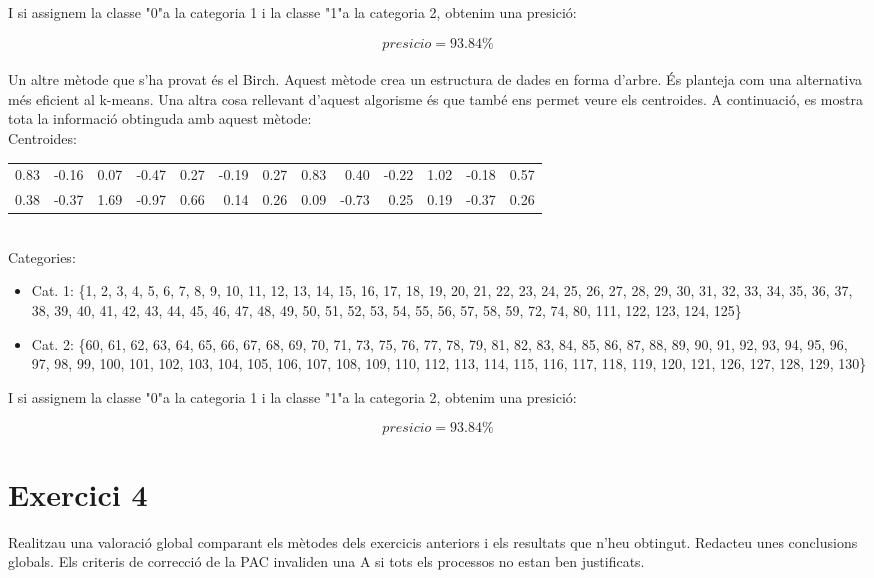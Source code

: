 \documentclass{article} %
\begin{document}
{	I si assignem la classe "0"a la categoria 1 i la classe "1"a la categoria 2, obtenim una presició:

	\[presicio = 93.84\%\] \\

	Un altre mètode que s'ha provat és el Birch. Aquest mètode crea un estructura de dades en forma d'arbre. És planteja com una alternativa més eficient al k-means. Una altra cosa rellevant d'aquest algorisme és que també ens permet veure els centroides. A continuació, es mostra tota la informació obtinguda amb aquest mètode: \\

	Centroides: \\

	{\selectfont\small
	\begin{tabular}{r r r r r r r r r r r r r}
		0.83 & -0.16 & 0.07 & -0.47 & 0.27 & -0.19 & 0.27 & 0.83 & 0.40 & -0.22 & 1.02 & -0.18 & 0.57 \\
		0.38 & -0.37 & 1.69 & -0.97 & 0.66 & 0.14 & 0.26 & 0.09 & -0.73 & 0.25 & 0.19 & -0.37 & 0.26 \\
	\end{tabular}
	} \\

	Categories:

	\begin{itemize}
		\item[] Cat. 1: \{1, 2, 3, 4, 5, 6, 7, 8, 9, 10, 11, 12, 13, 14, 15, 16, 17, 18, 19, 20, 21, 22, 23, 24, 25, 26, 27, 28, 29, 30, 31, 32, 33, 34, 35, 36, 37, 38, 39, 40, 41, 42, 43, 44, 45, 46, 47, 48, 49, 50, 51, 52, 53, 54, 55, 56, 57, 58, 59, 72, 74, 80, 111, 122, 123, 124, 125\}
		\item[] Cat. 2: \{60, 61, 62, 63, 64, 65, 66, 67, 68, 69, 70, 71, 73, 75, 76, 77, 78, 79, 81, 82, 83, 84, 85, 86, 87, 88, 89, 90, 91, 92, 93, 94, 95, 96, 97, 98, 99, 100, 101, 102, 103, 104, 105, 106, 107, 108, 109, 110, 112, 113, 114, 115, 116, 117, 118, 119, 120, 121, 126, 127, 128, 129, 130\}
	\end{itemize}

	I si assignem la classe "0"a la categoria 1 i la classe "1"a la categoria 2, obtenim una presició:

	\[presicio = 93.84\%\]
}

\section{Exercici 4}
Realitzau una valoració global comparant els mètodes dels exercicis anteriors i els resultats que n'heu obtingut. Redacteu unes conclusions globals. Els criteris de correcció de la PAC invaliden una A si tots els processos no estan ben justificats.
\\
\end{document}
